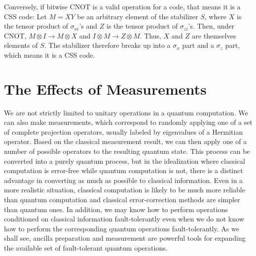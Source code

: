 \documentclass{report}
\newcommand{\X}{\sigma_x}
\newcommand{\Z}{\sigma_z}
\newcommand{\Xs}[1]{\sigma_{x{#1}}}
\newcommand{\Zs}[1]{\sigma_{z{#1}}}
\begin{document}
Conversely, if bitwise CNOT is a valid operation for a code, that means it is 
a CSS code: Let $M = X Y$ be an arbitrary element of the stabilizer $S$, 
where $X$ is the tensor product of $\Xs{i}$'s and $Z$ is the tensor product of 
$\Zs{i}$'s.  Then, under CNOT, $M \otimes I \rightarrow M \otimes X$ and 
$I \otimes M \rightarrow Z \otimes M$.  Thus, $X$ and $Z$ are themselves 
elements of $S$.  The stabilizer therefore breaks up into a $\X$ part and a 
$\Z$ part, which means it is a CSS code.

\section{The Effects of Measurements}
\label{sec-measurements}

We are not strictly limited to unitary operations in a quantum 
computation.  We can also make measurements, which correspond to 
randomly applying one of a set of complete projection operators, usually 
labeled by eigenvalues of a Hermitian operator.  Based on the classical 
measurement result, we can then apply one of a number of possible 
operators to the resulting quantum state.  This process can be converted 
into a purely quantum process, but in the idealization where classical 
computation is error-free while quantum computation is not, there is a 
distinct advantage in converting as much as possible to classical 
information.  Even in a more realistic situation, classical computation is 
likely to be much more reliable than quantum computation and classical 
error-correction methods are simpler than quantum ones.  In addition, we 
may know how to perform operations conditioned on classical information 
fault-tolerantly even when we do not know how to perform the 
corresponding quantum operations fault-tolerantly.  As we shall see, 
ancilla preparation and measurement are powerful tools for expanding the 
available set of fault-tolerant quantum operations.
\end{document}
